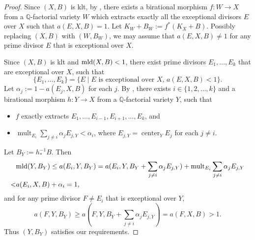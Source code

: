 \documentclass[11pt]{amsart}
\numberwithin{equation}{section}
\newcommand\han[1]{\todo[color=yellow!40]{#1}} %
\newcommand{\Qq}{\mathbb{Q}}
\newcommand{\Center}{\operatorname{center}}
\newcommand{\mld}{{\rm{mld}}}
\newcommand{\mult}{\operatorname{mult}}
\newtheorem{thm}{Theorem}[section]
\theoremstyle{definition}
\theoremstyle{definition}
\begin{document}
\begin{proof}
Since $(X,B)$ is klt, by \cite[Corollary 1.4.3]{BCHM10}, there exists a birational morphism $f: W\rightarrow X$ from a $\Qq$-factorial variety $W$ which extracts exactly all the exceptional divisors $E$ over $X$ such that $a(E,X,B)=1$. Let $K_W+B_W:=f^*(K_X+B)$. Possibly replacing $(X,B)$ with $(W,B_W)$, we may assume that $a(E,X,B)\neq1$ for any prime divisor $E$ that is exceptional over $X$.

Since $(X,B)$ is klt and $\mld(X,B)<1$, there exist prime divisors $E_1,\dots,E_k$ that are exceptional over $X$, such that
$$\{E_1,\dots,E_k\}=\{E\mid E\text{ is exceptional over }X,\, a(E,X,B)<1\}.$$
Let $\alpha_j:=1-a(E_j,X,B)$ for each $j$. By \cite[Lemma 5.3]{Liu18}, there exists $i\in\{1,2,\dots,k\}$ and a birational morphism $h: Y\rightarrow X$ from a $\mathbb{Q}$-factorial variety $Y$, such that
\begin{itemize}
    \item $f$ exactly extracts $E_1,\dots,E_{i-1},E_{i+1},\dots,E_k$, and
    \item $\mult_{E_i}\sum_{j\not=i}\alpha_jE_{j,Y}<\alpha_i$, where $E_{j,Y}=\Center_YE_j$ for each $j\neq i$.%
\end{itemize}
Let $B_Y:=h_*^{-1}B$. Then
\begin{align*}
    &\mld(Y,B_Y)\leq a(E_i,Y,B_Y)=a(E_i,Y,B_Y+\sum_{j\neq i}\alpha_j E_{j,Y})+\mult_{E_i} \sum_{j\neq i}\alpha_j E_{j,Y}\\
   <&a(E_i,X,B)+\alpha_i=1,
\end{align*}
and for any prime divisor $F\not=E_i$ that is exceptional over $Y$,
$$a(F,Y,B_Y)\geq a(F,Y,B_Y+\sum_{j\not=i}\alpha_jE_{j,Y})=a(F,X,B)>1.$$
Thus $(Y,B_Y)$ satisfies our requirements.
\end{proof}

\end{document}
